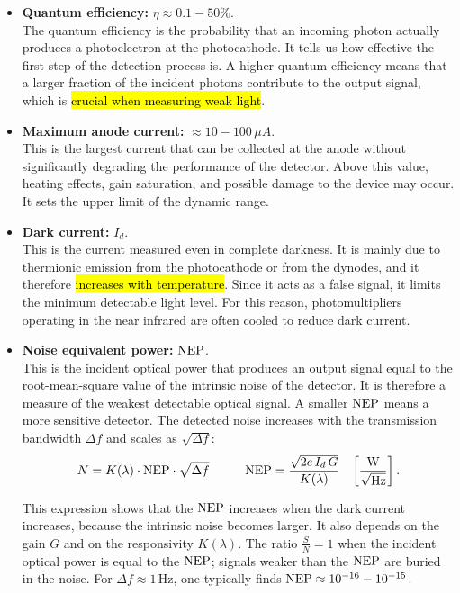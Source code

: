 \begin{itemize}
    \item \textbf{Quantum efficiency:} $\eta \approx 0.1-50\%$.\\
    The quantum efficiency is the probability that an incoming photon actually produces a photoelectron at the photocathode. It tells us how effective the first step of the detection process is. A higher quantum efficiency means that a larger fraction of the incident photons contribute to the output signal, which is \hl{crucial when measuring weak light}.

    \item \textbf{Maximum anode current:} $\approx 10-100\,\mu A$.\\
    This is the largest current that can be collected at the anode without significantly degrading the performance of the detector. Above this value, heating effects, gain saturation, and possible damage to the device may occur. It sets the upper limit of the dynamic range.

    \item \textbf{Dark current:} $I_d$.\\
    This is the current measured even in complete darkness. It is mainly due to thermionic emission from the photocathode or from the dynodes, and it therefore \hl{increases with temperature}. Since it acts as a false signal, it limits the minimum detectable light level. For this reason, photomultipliers operating in the near infrared are often cooled to reduce dark current.

    \item \textbf{Noise equivalent power:} $\mathrm{NEP}$.\\
    This is the incident optical power that produces an output signal equal to the root-mean-square value of the intrinsic noise of the detector. It is therefore a measure of the weakest detectable optical signal. A smaller $\mathrm{NEP}$ means a more sensitive detector.
    The detected noise increases with the transmission bandwidth $\Delta f$ and scales as $\sqrt{\Delta f}$:
    \begin{equation}\label{eqn:8-photomultiplier-NEP}
    N = K(\lambda)\cdot \mathrm{NEP} \cdot \sqrt{\Delta f}
    \hspace{1cm}
    \mathrm{NEP} = \frac{\sqrt{2e\,I_d\,G}}{K(\lambda)}
    \hspace{0.3cm}\left[\frac{\mathrm{W}}{\sqrt{\mathrm{Hz}}}\right].
    \end{equation}
    
    This expression shows that the $\mathrm{NEP}$ increases when the dark current increases, because the intrinsic noise becomes larger. It also depends on the gain $G$ and on the responsivity $K(\lambda)$.
    The ratio $\frac{S}{N}=1$ when the incident optical power is equal to the $\mathrm{NEP}$; signals weaker than the $\mathrm{NEP}$ are buried in the noise. For $\Delta f \approx 1\,\mathrm{Hz}$, one typically finds $\mathrm{NEP} \approx 10^{-16}-10^{-15}$.


\end{itemize}
